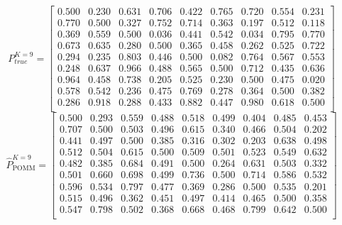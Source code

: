 \documentclass[11pt]{amsart}
\begin{document}
\[
P^{K=9}_{true} = 
\left[\begin{array}{ccccccccc}
0.500 & 0.230 & 0.631 & 0.706 & 0.422 & 0.765 & 0.720 & 0.554 & 0.231 \\
0.770 & 0.500 & 0.327 & 0.752 & 0.714 & 0.363 & 0.197 & 0.512 & 0.118 \\
0.369 & 0.559 & 0.500 & 0.036 & 0.441 & 0.542 & 0.034 & 0.795 & 0.770 \\
0.673 & 0.635 & 0.280 & 0.500 & 0.365 & 0.458 & 0.262 & 0.525 & 0.722 \\
0.294 & 0.235 & 0.803 & 0.446 & 0.500 & 0.082 & 0.764 & 0.567 & 0.553 \\
0.248 & 0.637 & 0.966 & 0.488 & 0.565 & 0.500 & 0.712 & 0.435 & 0.636 \\
0.964 & 0.458 & 0.738 & 0.205 & 0.525 & 0.230 & 0.500 & 0.475 & 0.020 \\
0.578 & 0.542 & 0.236 & 0.475 & 0.769 & 0.278 & 0.364 & 0.500 & 0.382 \\
0.286 & 0.918 & 0.288 & 0.433 & 0.882 & 0.447 & 0.980 & 0.618 & 0.500 \\
\end{array}\right] 
\]
\[ 
\hat{P}^{K=9}_{\text{POMM}} = 
\left[\begin{array}{ccccccccc}
0.500 & 0.293 & 0.559 & 0.488 & 0.518 & 0.499 & 0.404 & 0.485 & 0.453 \\
0.707 & 0.500 & 0.503 & 0.496 & 0.615 & 0.340 & 0.466 & 0.504 & 0.202 \\
0.441 & 0.497 & 0.500 & 0.385 & 0.316 & 0.302 & 0.203 & 0.638 & 0.498 \\
0.512 & 0.504 & 0.615 & 0.500 & 0.509 & 0.501 & 0.523 & 0.549 & 0.632 \\
0.482 & 0.385 & 0.684 & 0.491 & 0.500 & 0.264 & 0.631 & 0.503 & 0.332 \\
0.501 & 0.660 & 0.698 & 0.499 & 0.736 & 0.500 & 0.714 & 0.586 & 0.532 \\
0.596 & 0.534 & 0.797 & 0.477 & 0.369 & 0.286 & 0.500 & 0.535 & 0.201 \\
0.515 & 0.496 & 0.362 & 0.451 & 0.497 & 0.414 & 0.465 & 0.500 & 0.358 \\
0.547 & 0.798 & 0.502 & 0.368 & 0.668 & 0.468 & 0.799 & 0.642 & 0.500 \\
\end{array}\right] 
\]
\end{document}
